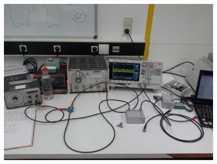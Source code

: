 
\FloatBarrier\begin{figure}[!h]
\centering
\includegraphics[scale=1]{../Grafiken/Versuchsaufbau_c_AmpModuliertTraeger.jpg}
\caption{\label{fig:versuchsaufbau_c_ampmodulierttraeger}}
\end{figure}
\FloatBarrier